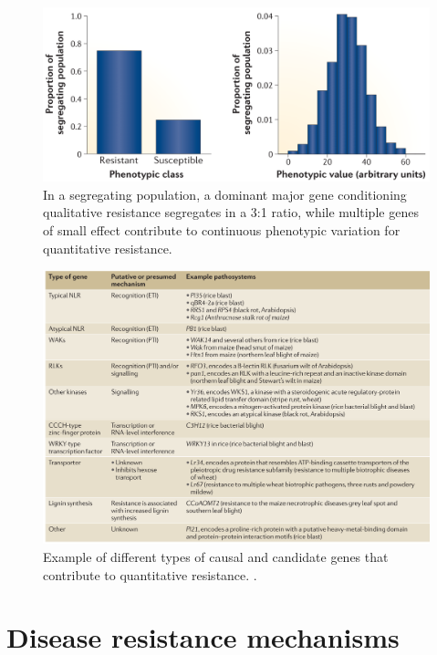 \documentclass[11pt,dvipsnames,ignorenonframetext,aspectratio=169]{beamer}
\begin{document}
\begin{frame}{}
\protect\hypertarget{section-15}{}
\begin{figure}
\includegraphics[width=0.99\linewidth]{../images/qualitative_quantitative_segregation} \caption{In a segregating population, a dominant major gene conditioning qualitative resistance segregates in a 3:1 ratio, while multiple genes of small effect contribute to continuous phenotypic variation for quantitative resistance.}\label{fig:quantitative-qualitative-segregation}
\end{figure}
\end{frame}

\begin{frame}{}
\protect\hypertarget{section-16}{}
\begin{figure}
\includegraphics[width=0.7\linewidth]{../images/quantitative_candidate} \caption{Example of different types of causal and candidate genes that contribute to quantitative resistance. \cite{nelson2018navigating}.}\label{fig:quantitative-candidate-genes}
\end{figure}
\end{frame}

\hypertarget{disease-resistance-mechanisms}{%
\section{Disease resistance
mechanisms}\label{disease-resistance-mechanisms}}
\end{document}
